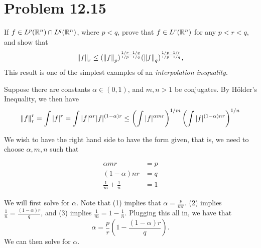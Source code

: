 \newpage
\section{Problem 12.15}
If $f \in L^p (\mathbb{R}^n) \cap L^q(\mathbb{R}^n)$, where $p < q$, prove that $f \in L^r(\mathbb{R}^n)$ for any $p < r < q$, and show that 
\[\norm{f}_r \leq (\norm{f}_p)^{\frac{1 / r - 1 / q}{1 / p - 1 / q}} (\norm{f}_q)^{\frac{1 / p - 1 / r}{1 / p - 1 / q}},\]
This result is one of the simplest examples of an \textit{interpolation inequality}.
\partbreak
\begin{solution}

    Suppose there are constants $\alpha \in (0, 1)$, and $m, n > 1$ be conjugates. By H\"older's Inequality, we then have 
    \[\norm{f}_r^r = \int |f|^r = \int |f|^{\alpha r} |f|^{(1 - \alpha)r} \leq \left( \int |f|^{\alpha m r}\right)^{1 / m} \left( \int |f|^{(1 - \alpha)nr}\right)^{1 / n} \]

    We wish to have the right hand side to have the form given, that is, we need to choose $\alpha, m , n$ such that
    \begin{center}
        \begin{align}
            \alpha m r &= p\\
            (1 - \alpha)nr &= q\\
            \frac{1}{m} + \frac{1}{n} &= 1        
        \end{align}
    \end{center}
    We will first solve for $\alpha$. Note that (1) implies that $\alpha = \frac{p}{mr}$. (2) implies $\frac{1}{n} = \frac{(1 - \alpha)r}{q}$, and (3) implies $\frac{1}{m} = 1 - \frac{1}{n}$. Plugging this all in, we have that 
    \[\alpha = \frac{p}{r}\left(1 - \frac{(1 - \alpha)r}{q}\right).\]
    We can then solve for $\alpha$.


\end{solution}
